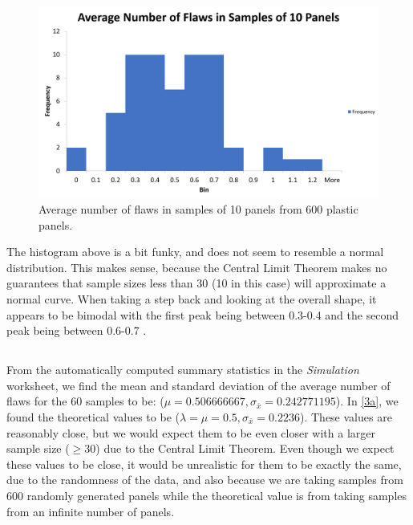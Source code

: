 \documentclass[letterpaper]{article}
\begin{document}
\begin{figure}[H]
 \centering
 \includegraphics[width=\textwidth]{q4.png}
 \caption{Average number of flaws in samples of 10 panels from 600 plastic panels.}
 \label{4c}
\end{figure}

The histogram above is a bit funky, and does not seem to resemble a normal
distribution.  This makes sense, because the Central Limit Theorem makes no
guarantees that sample sizes less than 30  (10 in this case) will approximate a
normal curve. When taking a step back and looking at the overall shape, it
appears to be bimodal with the first peak being between 0.3-0.4 and the second
peak being between 0.6-0.7 .

\subsection{}%

\label{4d}
From the automatically computed summary statistics in the \textit{Simulation}
worksheet, we find the mean and standard deviation of the average number of
flaws for the 60 samples to be: ($\mu=0.506666667,
 \sigma_{\bar{x}}=0.242771195$). In \ref{3a}, we found the theoretical values to
be ($\lambda=\mu=0.5, \sigma_{\bar{x}}=0.2236$). These values are reasonably
close, but we would expect them to be even closer with a larger sample size
($\geq 30$) due to the Central Limit Theorem. Even though we expect these values
to be close, it would be unrealistic for them to be exactly the same, due to the
randomness of the data, and also because we are taking samples from 600 randomly
generated panels while the theoretical value is from taking samples from an
infinite number of panels.
\end{document}
